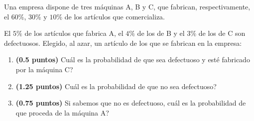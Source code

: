 
Una empresa dispone de tres máquinas A, B y C, que fabrican, respectivamente, el $60\%$, $30\%$ y $10\%$ de los artículos que comercializa.

El $5\%$ de los artículos que fabrica A, el $4\%$ de los de B y el $3\%$ de los de C son defectuosos. Elegido, al azar, un artículo de los que se fabrican en la empresa:
\begin{enumerate}[label=\alph*)]
\item \textbf{(0.5 puntos)} \textquestiondown{}Cuál es la probabilidad de que sea defectuoso y esté fabricado por la máquina C?
\item \textbf{(1.25 puntos)} \textquestiondown{}Cuál es la probabilidad de que no sea defectuoso?
\item \textbf{(0.75 puntos)} Si sabemos que no es defectuoso, \textquestiondown{}cuál es la probabilidad de que proceda de la máquina A?
\end{enumerate}
